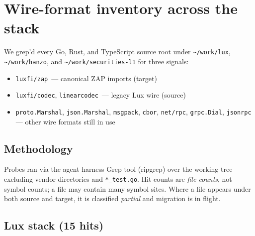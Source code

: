 \section{Wire-format inventory across the stack}
\label{sec:inventory}

We grep'd every Go, Rust, and TypeScript source root under
\texttt{\~{}/work/lux}, \texttt{\~{}/work/hanzo}, and
\texttt{\~{}/work/securities-l1} for three signals:

\begin{itemize}[leftmargin=*]
  \item \texttt{luxfi/zap}~--- canonical ZAP imports (target)
  \item \texttt{luxfi/codec}, \texttt{linearcodec}~--- legacy Lux wire (source)
  \item \texttt{proto.Marshal}, \texttt{json.Marshal}, \texttt{msgpack},
        \texttt{cbor}, \texttt{net/rpc}, \texttt{grpc.Dial}, \texttt{jsonrpc}
        --- other wire formats still in use
\end{itemize}

\subsection{Methodology}

Probes ran via the agent harness Grep tool (ripgrep) over the working tree
excluding vendor directories and \texttt{*\_test.go}. Hit counts are
\emph{file counts}, not symbol counts; a file may contain many symbol
sites. Where a file appears under both source and target, it is classified
\emph{partial} and migration is in flight.

\subsection{Lux stack (15 hits)}

